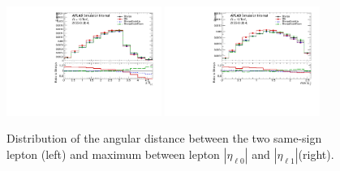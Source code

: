\begin{figure}[!htb]
\centering
\includegraphics[width=0.45\textwidth]{Plots/ttV/c_Region_1_DRll01}
\includegraphics[width=0.45\textwidth]{Plots/ttV/c_Region_1_maxEta_ll} 
  \caption{Distribution of the angular distance between the two same-sign lepton (left) and  maximum between lepton $|\eta_{\ell 0}|$ and $|\eta_{\ell 1}|$(right).
   \label{ttV:ll_kin}}
\end{figure}
% 




